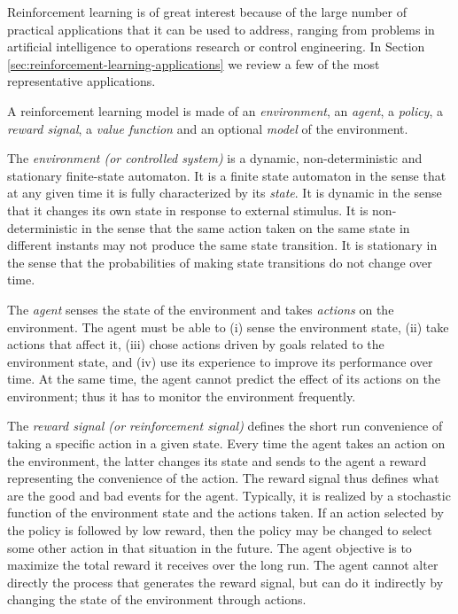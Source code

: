 Reinforcement learning is of great interest because of the large number of practical applications that it can be used to address, ranging from problems in artificial intelligence to operations research or control engineering. In Section \ref{sec:reinforcement-learning-applications} we review a few of the most representative applications.

A reinforcement learning model is made of an \textit{environment}, an \textit{agent}, a \textit{policy}, a \textit{reward signal}, a \textit{value function} and an optional \textit{model} of the environment.

The \textit{environment (or controlled system)} is a dynamic, non-deterministic and stationary finite-state automaton.
It is a finite state automaton in the sense that at any given time it is fully characterized by its \textit{state}.
It is dynamic in the sense that it changes its own state in response to external stimulus.
It is non-deterministic in the sense that the same action taken on the same state in different instants may not produce the same state transition.
It is stationary in the sense that the probabilities of making state transitions do not change over time.

The \textit{agent} senses the state of the environment and takes \textit{actions} on the environment. The agent must be able to 
(i) sense the environment state,
(ii) take actions that affect it, 
(iii) chose actions driven by goals related to the environment state, and
(iv) use its experience to improve its performance over time.
%
At the same time, the agent cannot predict the effect of its actions on the environment; thus it has to monitor the environment frequently.

The \textit{reward signal (or reinforcement signal)} defines the short run convenience of taking a specific action in a given state.
Every time the agent takes an action on the environment, the latter changes its state and sends to the agent a reward representing the convenience of the action.
The reward signal thus defines what are the good and bad events for the agent.
Typically, it is realized by a stochastic function of the environment state and the actions taken.
If an action selected by the policy is followed by low reward, then the policy may be changed to select some other action in that situation in the future.
The agent objective is to maximize the total reward it receives over the long run.
The agent cannot alter directly the process that generates the reward signal, but can do it indirectly by changing the state of the environment through actions.

